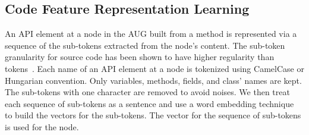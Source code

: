 \subsection{Code Feature Representation Learning}
\label{sec:features}

An API element at a node in the AUG built from a method is represented
via a sequence of the sub-tokens extracted from the node's
content. The sub-token granularity for source code has been shown to
have higher regularity than tokens~\cite{icse20-methodname}. Each name
of an API element at a node is tokenized using CamelCase or Hungarian
convention. Only variables, methods, fields, and class' names
are kept. The sub-tokens with one character are removed to avoid
noises. We then treat each sequence of sub-tokens as a sentence and
use a word embedding technique~\cite{glove2014} to build the vectors
for the sub-tokens.  The vector for the sequence of sub-tokens is used
for the node.
